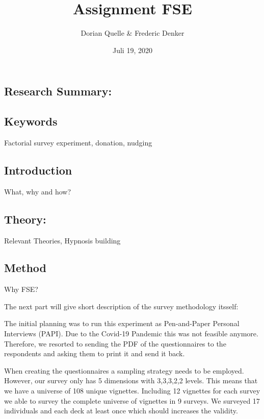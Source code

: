 \documentclass[
  12pt,
]{article}
\title{Assignment FSE}
\author{Dorian Quelle \& Frederic Denker}
\date{Juli 19, 2020}
\begin{document}
\maketitle

\hypertarget{research-summary}{%
\subsection{Research Summary:}\label{research-summary}}

\hypertarget{keywords}{%
\subsection{Keywords}\label{keywords}}

Factorial survey experiment, donation, nudging

\newpage

\hypertarget{introduction}{%
\subsection{Introduction}\label{introduction}}

What, why and how?

\hypertarget{theory}{%
\subsection{Theory:}\label{theory}}

Relevant Theories, Hypnosis building

\hypertarget{method}{%
\subsection{Method}\label{method}}

Why FSE?

The next part will give short description of the survey methodology
itsself:

The initial planning was to run this experiment as Pen-and-Paper
Personal Interviews (PAPI). Due to the Covid-19 Pandemic this was not
feasible anymore. Therefore, we resorted to sending the PDF of the
questionnaires to the respondents and asking them to print it and send
it back.

When creating the questionnaires a sampling strategy needs to be
employed. However, our survey only has 5 dimensions with 3,3,3,2,2
levels. This means that we have a universe of 108 unique vignettes.
Including 12 vignettes for each survey we able to survey the complete
universe of vignettes in 9 surveys. We surveyed 17 individuals and each
deck at least once which should increases the validity.
\end{document}
